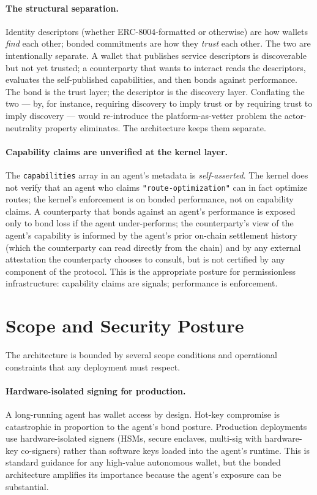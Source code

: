 \documentclass[11pt,a4paper]{article}
\theoremstyle{definition}
\theoremstyle{remark}
\begin{document}
\paragraph{The structural separation.}
Identity descriptors (whether ERC-8004-formatted or otherwise)
are how wallets \emph{find} each other; bonded commitments are
how they \emph{trust} each other. The two are intentionally
separate. A wallet that publishes service descriptors is
discoverable but not yet trusted; a counterparty that wants to
interact reads the descriptors, evaluates the self-published
capabilities, and then bonds against performance. The bond is
the trust layer; the descriptor is the discovery layer.
Conflating the two --- by, for instance, requiring discovery to
imply trust or by requiring trust to imply discovery --- would
re-introduce the platform-as-vetter problem the actor-neutrality
property eliminates. The architecture keeps them separate.

\paragraph{Capability claims are unverified at the kernel layer.}
The \texttt{capabilities} array in an agent's metadata is
\emph{self-asserted}. The kernel does not verify that an agent
who claims \texttt{"route-optimization"} can in fact optimize
routes; the kernel's enforcement is on bonded performance, not
on capability claims. A counterparty that bonds against an agent's
performance is exposed only to bond loss if the agent under-performs;
the counterparty's view of the agent's capability is informed by
the agent's prior on-chain settlement history (which the counterparty
can read directly from the chain) and by any external attestation
the counterparty chooses to consult, but is not certified by any
component of the protocol. This is the appropriate posture for
permissionless infrastructure: capability claims are signals;
performance is enforcement.

\section{Scope and Security Posture}
\label{sec:scope}

The architecture is bounded by several scope conditions and operational
constraints that any deployment must respect.

\paragraph{Hardware-isolated signing for production.}
A long-running agent has wallet access by design. Hot-key compromise
is catastrophic in proportion to the agent's bond posture. Production
deployments use hardware-isolated signers (HSMs, secure enclaves,
multi-sig with hardware-key co-signers) rather than software keys
loaded into the agent's runtime. This is standard guidance for any
high-value autonomous wallet, but the bonded architecture amplifies
its importance because the agent's exposure can be substantial.
\end{document}
